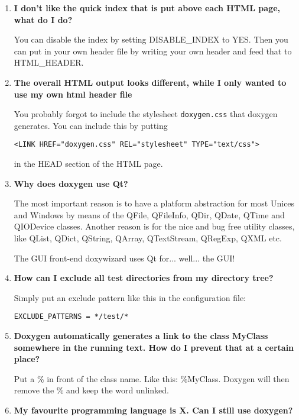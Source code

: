 \begin{enumerate}
\item {\bf I don't like the quick index that is put above each HTML page, what do I do?}

You can disable the index by setting DISABLE\_\-INDEX to YES. Then you can put in your own header file by writing your own header and feed that to HTML\_\-HEADER.

\item {\bf The overall HTML output looks different, while I only wanted to use my own html header file}

You probably forgot to include the stylesheet {\tt doxygen.css} that doxygen generates. You can include this by putting 

\footnotesize\begin{verbatim}
<LINK HREF="doxygen.css" REL="stylesheet" TYPE="text/css">
\end{verbatim}
\normalsize
 in the HEAD section of the HTML page.

\item {\bf Why does doxygen use Qt?}

The most important reason is to have a platform abstraction for most Unices and Windows by means of the QFile, QFileInfo, QDir, QDate, QTime and QIODevice classes. Another reason is for the nice and bug free utility classes, like QList, QDict, QString, QArray, QTextStream, QRegExp, QXML etc.

The GUI front-end doxywizard uses Qt for... well... the GUI!

\item {\bf How can I exclude all test directories from my directory tree?}

Simply put an exclude pattern like this in the configuration file:



\footnotesize\begin{verbatim}
EXCLUDE_PATTERNS = */test/*
\end{verbatim}
\normalsize


\item {\bf Doxygen automatically generates a link to the class MyClass somewhere in the running text. How do I prevent that at a certain place?}

Put a \% in front of the class name. Like this: \%MyClass. Doxygen will then remove the \% and keep the word unlinked.

\item {\bf My favourite programming language is X. Can I still use doxygen?}


\end{enumerate}
